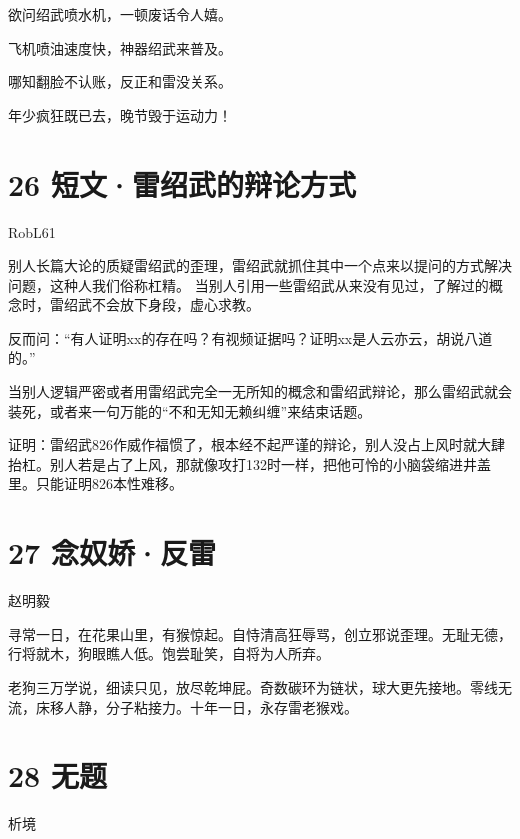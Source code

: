 \documentclass[UTF8,12pt,oneside]{ctexbook}
\begin{document}
        \begin{center}
        欲问绍武喷水机，一顿废话令人嬉。
        
        飞机喷油速度快，神器绍武来普及。
        
        哪知翻脸不认账，反正和雷没关系。
        
        年少疯狂既已去，晚节毁于运动力！
        ~\\
        \end{center}
        
    \section{26 短文·雷绍武的辩论方式}
        \begin{center}
            RobL61
        \end{center}
        
        别人长篇大论的质疑雷绍武的歪理，雷绍武就抓住其中一个点来以提问的方式解决问题，这种人我们俗称杠精。
        当别人引用一些雷绍武从来没有见过，了解过的概念时，雷绍武不会放下身段，虚心求教。
        
        反而问：“有人证明xx的存在吗？有视频证据吗？证明xx是人云亦云，胡说八道的。”
        
        当别人逻辑严密或者用雷绍武完全一无所知的概念和雷绍武辩论，那么雷绍武就会装死，或者来一句万能的“不和无知无赖纠缠”来结束话题。
        
        证明：雷绍武826作威作福惯了，根本经不起严谨的辩论，别人没占上风时就大肆抬杠。别人若是占了上风，那就像攻打132时一样，把他可怜的小脑袋缩进井盖里。只能证明826本性难移。
        
    \section{27 念奴娇·反雷}
        \begin{center}
            赵明毅
        \end{center}

        寻常一日，在花果山里，有猴惊起。自恃清高狂辱骂，创立邪说歪理。无耻无德，行将就木，狗眼瞧人低。饱尝耻笑，自将为人所弃。 
        
        老狗三万学说，细读只见，放尽乾坤屁。奇数碳环为链状，球大更先接地。零线无流，床移人静，分子粘接力。十年一日，永存雷老猴戏。
        
    \section{28 无题}
        \begin{center}
            析境
        \end{center}
            
\end{document}
